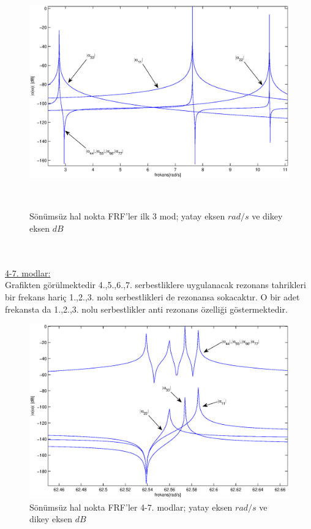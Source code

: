 \documentclass[a4paper]{report}
\begin{document}
\begin{figure}[H]
\shorthandoff{=}
\centerline{
{\includegraphics[width=1.3\textwidth]{./noktaFRFmod1-3.eps}}}
~\\

\caption[Sönümsüz hal nokta FRF'ler]{Sönümsüz hal nokta FRF'ler ilk 3 mod; yatay eksen ${rad}/{s}$ ve dikey eksen $dB$ }
\label{fig:noktaFRF1-3}
\end{figure}
~\\
\clearpage~\\
\underline{4-7. modlar:}\\
Grafikten görülmektedir 4.,5.,6.,7. serbestliklere uygulanacak rezonans tahrikleri bir frekans hariç 1.,2.,3. nolu serbestlikleri de rezonansa sokacaktır. O bir adet frekansta da 1.,2.,3. nolu serbestlikler anti rezonans özelliği göstermektedir.
\begin{figure}[H]
\shorthandoff{=}
\centerline{
{\includegraphics[width=1.3\textwidth]{./noktaFRFmod3-7.eps}}}
\caption[Sönümsüz hal nokta FRF'ler]{Sönümsüz hal nokta FRF'ler  4-7. modlar; yatay eksen ${rad}/{s}$ ve dikey eksen $dB$ }
\label{fig:noktaFRF4-7}
\end{figure}
\end{document}
